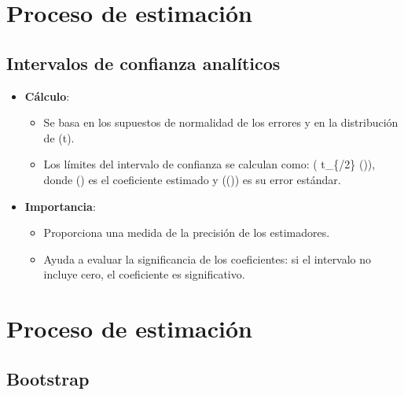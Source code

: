 \documentclass[
  letterpaper,
  DIV=11,
  numbers=noendperiod]{scrreprt}
\providecommand{\tightlist}{%
  \setlength{\itemsep}{0pt}\setlength{\parskip}{0pt}}\usepackage{longtable,booktabs,array}
\begin{document}
\section{Proceso de estimación}\label{proceso-de-estimaciuxf3n}

\subsection{Intervalos de confianza
analíticos}\label{intervalos-de-confianza-analuxedticos-1}

\begin{itemize}
\tightlist
\item
  \textbf{Cálculo}:

  \begin{itemize}
  \tightlist
  \item
    Se basa en los supuestos de normalidad de los errores y en la
    distribución de (t).
  \item
    Los límites del intervalo de confianza se calculan como:
    (\hat{\beta} \pm t\_\{\alpha/2\} \cdot {}(\hat{\beta})),
    donde (\hat{\beta}) es el coeficiente estimado y
    ((\hat{\beta})) es su error estándar.
  \end{itemize}
\item
  \textbf{Importancia}:

  \begin{itemize}
  \tightlist
  \item
    Proporciona una medida de la precisión de los estimadores.
  \item
    Ayuda a evaluar la significancia de los coeficientes: si el
    intervalo no incluye cero, el coeficiente es significativo.
  \end{itemize}
\end{itemize}

\section{Proceso de estimación}\label{proceso-de-estimaciuxf3n-1}

\subsection{Bootstrap}\label{bootstrap-1}
\end{document}
